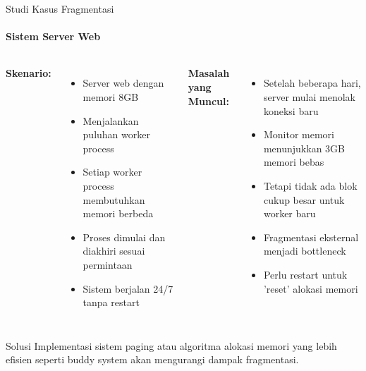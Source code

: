 \documentclass[10pt,aspectratio=169]{beamer}
\begin{document}
\begin{frame}{Studi Kasus Fragmentasi}
    \framesubtitle{Sistem Server Web}
    
    \begin{columns}[T]
            \textbf{Skenario:}
            \begin{itemize}
                \item Server web dengan memori 8GB
                \item Menjalankan puluhan worker process
                \item Setiap worker process membutuhkan memori berbeda
                \item Proses dimulai dan diakhiri sesuai permintaan
                \item Sistem berjalan 24/7 tanpa restart
            \end{itemize}
            
            \textbf{Masalah yang Muncul:}
            \begin{itemize}
                \item Setelah beberapa hari, server mulai menolak koneksi baru
                \item Monitor memori menunjukkan 3GB memori bebas
                \item Tetapi tidak ada blok cukup besar untuk worker baru
                \item Fragmentasi eksternal menjadi bottleneck
                \item Perlu restart untuk 'reset' alokasi memori
            \end{itemize}
    \end{columns}
    
    \begin{alertblock}{Solusi}
        Implementasi sistem paging atau algoritma alokasi memori yang lebih efisien seperti buddy system akan mengurangi dampak fragmentasi.
    \end{alertblock}
\end{frame}
\end{document}
